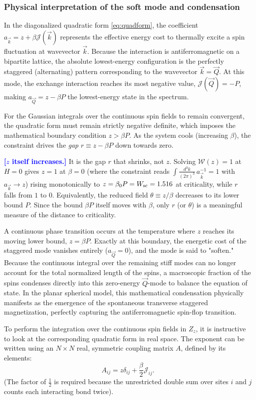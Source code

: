 \documentclass[11pt,a4paper]{article}
\newcommand{\Jc}{\mathcal{J}}
\newcommand{\bk}{\vec k}
\newcommand{\bQ}{\vec Q}
\newcommand{\dk}{\frac{d^3k}{(2\pi)^3}}
\newcommand{\Wc}{\mathcal{W}}
\newcommand{\FLAG}[1]{\textcolor{blue}{\textbf{[#1]}}}
\newcommand{\Jc}{\mathcal{J}}
\newcommand{\bk}{\vec k}
\newcommand{\bQ}{\vec Q}
\newcommand{\dk}{\frac{d^3k}{(2\pi)^3}}
\newcommand{\Wc}{\mathcal{W}}
\newcommand{\FLAG}[1]{\textcolor{blue}{\textbf{[#1]}}}
\begin{document}
\subsubsection{Physical interpretation of the soft mode and condensation}
In the diagonalized quadratic form \eqref{eq:quadform}, the coefficient $a_{\bk} = z + \beta \Jc(\bk)$ represents the effective energy cost to thermally excite a spin fluctuation at wavevector $\bk$. Because the interaction is antiferromagnetic on a bipartite lattice, the absolute lowest-energy configuration is the perfectly staggered (alternating) pattern corresponding to the wavevector $\bk = \bQ$. At this mode, the exchange interaction reaches its most negative value, $\Jc(\bQ) = -P$, making $a_{\bQ} = z - \beta P$ the lowest-energy state in the spectrum.

For the Gaussian integrals over the continuous spin fields to remain convergent, the quadratic form must remain strictly negative definite, which imposes the mathematical boundary condition $z > \beta P$. As the system cools (increasing $\beta$), the constraint drives the \emph{gap} $r\equiv z-\beta P$ down towards zero.

\FLAG{$z$ itself increases.} It is the gap $r$ that shrinks, not $z$. Solving $\Wc(z)=1$ at
$H=0$ gives $z=1$ at $\beta=0$ (where the constraint reads $\int\!\dk\,a_{\bk}^{-1}=1$ with
$a_{\bk}\to z$) rising monotonically to $z=\beta_0P=W_{\rm sc}=1.516$ at criticality, while
$r$ falls from $1$ to $0$. Equivalently, the reduced field $\theta\equiv z/\beta$ decreases
to its lower bound $P$. Since the bound $\beta P$ itself moves with $\beta$, only $r$ (or
$\theta$) is a meaningful measure of the distance to criticality.

A continuous phase transition occurs at the temperature where $z$ reaches its moving lower bound, $z = \beta P$. Exactly at this boundary, the energetic cost of the staggered mode vanishes entirely ($a_{\bQ} = 0$), and the mode is said to "soften." Because the continuous integral over the remaining stiff modes can no longer account for the total normalized length of the spins, a macroscopic fraction of the spins condenses directly into this zero-energy $\bQ$-mode to balance the equation of state. In the planar spherical model, this mathematical condensation physically manifests as the emergence of the spontaneous transverse staggered magnetization, perfectly capturing the antiferromagnetic spin-flop transition.


To perform the integration over the continuous spin fields in $Z_z$, it is instructive to look at the corresponding quadratic form in real space. The exponent can be written using an $N \times N$ real, symmetric coupling matrix $A$, defined by its elements:
\begin{equation}
  A_{ij} = z\delta_{ij} + \frac{\beta}{2}\Jc_{ij}.
\end{equation}
(The factor of $\tfrac{1}{2}$ is required because the unrestricted double sum over sites $i$ and $j$ counts each interacting bond twice). 
\end{document}
